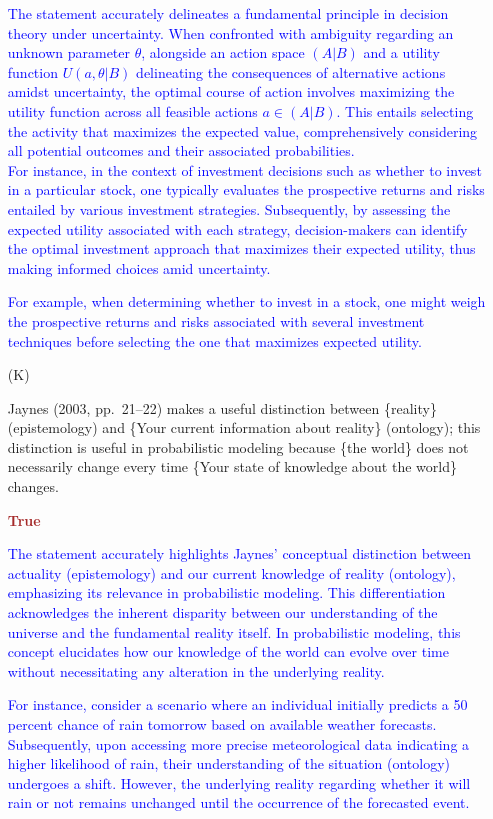 \documentclass[12pt]{article}
\begin{document}
\begin{itemize}
\textcolor{blue}{The statement accurately delineates a fundamental principle in decision theory under uncertainty. When confronted with ambiguity regarding an unknown parameter \(\theta\), alongside an action space \((A|B)\) and a utility function \(U(a, \theta|B)\) delineating the consequences of alternative actions amidst uncertainty, the optimal course of action involves maximizing the utility function across all feasible actions \(a \in (A|B)\). This entails selecting the activity that maximizes the expected value, comprehensively considering all potential outcomes and their associated probabilities. \\
For instance, in the context of investment decisions such as whether to invest in a particular stock, one typically evaluates the prospective returns and risks entailed by various investment strategies. Subsequently, by assessing the expected utility associated with each strategy, decision-makers can identify the optimal investment approach that maximizes their expected utility, thus making informed choices amid uncertainty.}

\textcolor{blue}{For example, when determining whether to invest in a stock, one might weigh the prospective returns and risks associated with several investment techniques before selecting the one that maximizes expected utility.}

\item[(K)]

Jaynes (2003, pp.~21--22) makes a useful distinction between
\{reality\} (epistemology) and \{Your current information about reality\}
(ontology); this distinction is useful in probabilistic modeling because
\{the world\} does not necessarily change every time \{Your state of
knowledge about the world\} changes.

\textcolor{brown}{\textbf{True}}

\textcolor{blue}{The statement accurately highlights Jaynes' conceptual distinction between actuality (epistemology) and our current knowledge of reality (ontology), emphasizing its relevance in probabilistic modeling. This differentiation acknowledges the inherent disparity between our understanding of the universe and the fundamental reality itself. In probabilistic modeling, this concept elucidates how our knowledge of the world can evolve over time without necessitating any alteration in the underlying reality.}

\textcolor{blue}{For instance, consider a scenario where an individual initially predicts a 50 percent chance of rain tomorrow based on available weather forecasts. Subsequently, upon accessing more precise meteorological data indicating a higher likelihood of rain, their understanding of the situation (ontology) undergoes a shift. However, the underlying reality regarding whether it will rain or not remains unchanged until the occurrence of the forecasted event.}


\end{itemize}
\end{document}
